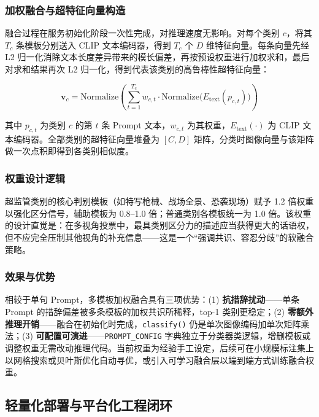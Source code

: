 \documentclass[UTF8, a4paper, 12pt]{ctexart}
\begin{document}
\subsubsection{加权融合与超特征向量构造}

融合过程在服务初始化阶段一次性完成，对推理速度无影响。对每个类别 $c$，将其 $T_c$ 条模板分别送入 CLIP 文本编码器，得到 $T_c$ 个 $D$ 维特征向量。每条向量先经 L2 归一化消除文本长度差异带来的模长偏差，再按预设权重进行加权求和，最后对求和结果再次 L2 归一化，得到代表该类别的高鲁棒性超特征向量：

\begin{equation}
 \mathbf{v}_c = \text{Normalize}\left(\sum_{t=1}^{T_c} w_{c,t} \cdot \text{Normalize}\big(E_{\text{text}}(p_{c,t})\big)\right)
\end{equation}

其中 $p_{c,t}$ 为类别 $c$ 的第 $t$ 条 Prompt 文本，$w_{c,t}$ 为其权重，$E_{\text{text}}(\cdot)$ 为 CLIP 文本编码器。全部类别的超特征向量堆叠为 $[C, D]$ 矩阵，分类时图像向量与该矩阵做一次点积即得到各类别相似度。

\subsubsection{权重设计逻辑}

超监管类别的核心判别模板（如特写枪械、战场全景、恐袭现场）赋予 1.2 倍权重以强化区分信号，辅助模板为 0.8--1.0 倍；普通类别各模板统一为 1.0 倍。该权重的设计直觉是：在多视角投票中，最具类别区分力的描述应当获得更大的话语权，但不应完全压制其他视角的补充信息——这是一个“强调共识、容忍分歧”的软融合策略。

\subsubsection{效果与优势}

相较于单句 Prompt，多模板加权融合具有三项优势：(1) \textbf{抗措辞扰动}——单条 Prompt 的措辞偏差被多条模板的加权共识所稀释，top-1 类别更稳定；(2) \textbf{零额外推理开销}——融合在初始化时完成，\texttt{classify()} 仍是单次图像编码加单次矩阵乘法；(3) \textbf{可配置可演进}——\texttt{PROMPT\_CONFIG} 字典独立于分类器类逻辑，增删模板或调整权重无需改动推理代码。当前权重为经验手工设定，后续可在小规模标注集上以网格搜索或贝叶斯优化自动寻优，或引入可学习融合层以端到端方式训练融合权重。

\subsection{轻量化部署与平台化工程闭环}
\end{document}
